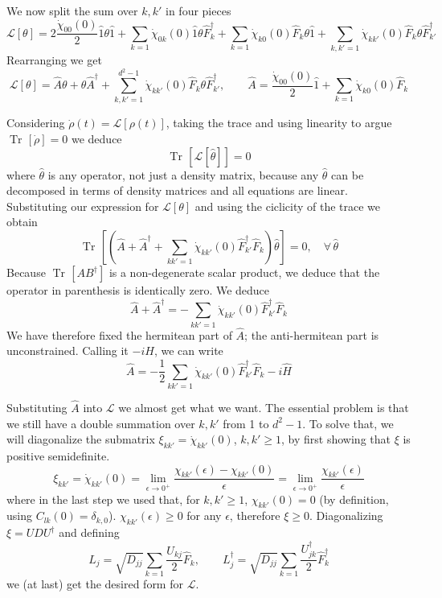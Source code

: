 \documentclass[a4paper, 11pt]{article}
\newcommand{\Tr}{\mathop{\mathrm{Tr}\!}{}}
\newcommand{\LL}{\mathcal{L}}
\begin{document}
	We now split the sum over $k,k'$ in four pieces
	\[ \LL[\theta] = 2 \dfrac{\dot{\chi}_{00}(0)}{2} \hat{1}\theta \hat{1} + \sum_{k=1} \dot{\chi}_{0k}(0) \hat{1} \theta \hat{F}_k^\dagger +
	\sum_{k=1} \dot{\chi}_{k0}(0) \hat{F}_k \theta \hat{1} + \sum_{k,k'=1} \dot{\chi}_{kk'}(0) \hat{F}_k \theta \hat{F}_{k'}^\dagger \]
	Rearranging we get
	\[ \LL[\theta] = \hat{A} \theta + \theta \hat{A}^\dagger + \sum_{k,k'=1}^{d^2-1} \dot{\chi}_{kk'}(0) \hat{F}_k \theta \hat{F}_{k'}^\dagger,\qquad	\hat{A} = \dfrac{\dot{\chi}_{00}(0)}{2} \hat{1} + \sum_{k=1} \dot{\chi}_{k0}(0) \hat{F}_k \]
	
	Considering $\dot{\rho}(t) = \LL[\rho(t)]$, taking the trace and using linearity to argue $\Tr[\dot{\rho}]=0$ we deduce
	\[ \Tr\left[ \LL[\hat{\theta}] \right] = 0 \]
	where $\hat{\theta}$ is any operator, not just a density matrix, because any $\hat{\theta}$ can be decomposed in terms of density matrices and all equations are linear. Substituting our expression for $\LL[\theta]$ and using the ciclicity of the trace we obtain
	\[ \Tr\left[ \left(\hat{A} + \hat{A}^\dagger + \sum_{kk'=1} \dot{\chi}_{kk'}(0) \hat{F}_{k'}^\dagger \hat{F}_k\right) \hat{\theta} \right] = 0,\quad \forall\, \hat{\theta} \]
	Because $\Tr[AB^\dagger]$ is a non-degenerate scalar product, we deduce that the operator in parenthesis is identically zero. We deduce
	\[ \hat{A} + \hat{A}^\dagger = - \sum_{kk'=1} \dot{\chi}_{kk'}(0) \hat{F}_{k'}^\dagger \hat{F}_k \]
	We have therefore fixed the hermitean part of $\hat{A}$; the anti-hermitean part is unconstrained. Calling it $-iH$, we can write
	\[ \hat{A} = -\frac{1}{2} \sum_{kk'=1} \dot{\chi}_{kk'}(0) \hat{F}_{k'}^\dagger \hat{F}_k - i\hat{H} \]
	
	Substituting $\hat{A}$ into $\LL$ we almost get what we want. The essential problem is that we still have a double summation over $k,k'$ from 1 to $d^2-1$. To solve that, we will diagonalize the submatrix $\xi_{kk'} = \dot{\chi}_{kk'}(0)$, $k,k'\ge 1$, by first showing that $\xi$ is positive semidefinite.
	\[ \xi_{kk'} = \dot{\chi}_{kk'}(0) = \lim_{\epsilon\rightarrow 0^+} \dfrac{\chi_{kk'}(\epsilon) -\chi_{kk'}(0)}{\epsilon} =
	\lim_{\epsilon\rightarrow 0^+} \dfrac{\chi_{kk'}(\epsilon)}{\epsilon} \]
	where in the last step we used that, for $k,k'\ge 1$, $\chi_{kk'}(0)=0$ (by definition, using $C_{lk}(0)=\delta_{k,0}$).
	$\chi_{kk'}(\epsilon)\ge 0$ for any $\epsilon$, therefore $\xi\ge 0$. Diagonalizing $\xi = UDU^\dagger$ and defining
	\[ L_j = \sqrt{D_{jj}} \sum_{k=1} \frac{U_{kj}}{2} \hat{F}_k,\qquad L_j^\dagger = \sqrt{D_{jj}} \sum_{k=1} \frac{U^\dagger_{jk}}{2} \hat{F}^\dagger_k \]
	we (at last) get the desired form for $\LL$.
	
\end{document}
